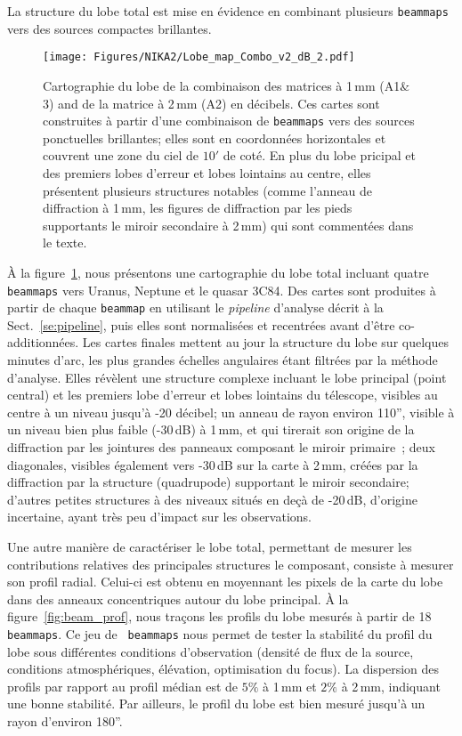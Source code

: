 La structure du lobe total est mise en évidence en combinant plusieurs
{\tt beammaps} vers des sources compactes brillantes.
\begin{figure}[!thbp]
\begin{center}
  \texttt{[image: Figures/NIKA2/Lobe\_map\_Combo\_v2\_dB\_2.pdf]}
\caption[Noticeable features of NIKA2 beam pattern.]{Cartographie du
  lobe de la combinaison des matrices à 1\,mm (A1$\&$3) and de la
  matrice à 2\,mm (A2) en décibels. Ces cartes sont construites à
  partir d'une combinaison de {\tt beammaps} vers des sources
  ponctuelles brillantes; elles sont en coordonnées horizontales et
  couvrent une zone du ciel de $10'$ de coté. En plus du lobe pricipal
  et des premiers lobes d'erreur et lobes lointains au centre, elles
  présentent plusieurs structures notables (comme l'anneau de
  diffraction à 1\,mm, les figures de diffraction par les pieds
  supportants le miroir secondaire à 2\,mm) qui sont commentées dans le
  texte.}
\label{fig:features}
\end{center}
\end{figure}
\`A la figure~\ref{fig:features}, nous présentons une cartographie du lobe
total incluant quatre {\tt beammaps} vers Uranus, Neptune et le quasar
3C84. Des cartes sont produites à partir de chaque {\tt beammap} en
utilisant le \emph{pipeline} d'analyse décrit à la
Sect.~\ref{se:pipeline}, puis elles sont normalisées et recentrées avant d'être
co-additionnées. Les cartes finales mettent au jour la structure du
lobe sur quelques minutes d'arc, les plus grandes échelles angulaires
étant filtrées par la méthode d'analyse. Elles révèlent une structure
complexe incluant le lobe principal (point central) et les premiers
lobe d'erreur et lobes lointains du télescope, visibles au centre à un
niveau jusqu'à -20 décibel; un anneau de rayon environ 110'',
visible à un niveau bien plus faible (-30\,dB) à 1\,mm, et qui
tirerait son origine de la diffraction par les jointures des panneaux
composant le miroir primaire~\citep{Greve2010}; deux diagonales,
visibles également vers -30\,dB sur la carte à 2\,mm, créées par la
diffraction par la structure (quadrupode) supportant le miroir
secondaire; d'autres petites structures à des niveaux situés en
deçà de -20\,dB, d'origine incertaine, ayant très peu d'impact sur
les observations.


Une autre manière de caractériser le lobe total, permettant de mesurer
les contributions relatives des principales structures le composant,
consiste à mesurer son profil radial. Celui-ci est obtenu en moyennant
les pixels de la carte du lobe dans des anneaux concentriques autour
du lobe principal. \`A la figure~\ref{fig:beam_prof}, nous traçons les
profils du lobe mesurés à partir de 18 {\tt beammaps}. Ce jeu de {\tt
  beammaps} nous permet de tester la stabilité du profil du lobe sous
différentes conditions d'observation (densité de flux de la source,
conditions atmosphériques, élévation, optimisation du focus). La
dispersion des profils par rapport au profil médian est de $5\%$ à
1\,mm et $2\%$ à 2\,mm, indiquant une bonne stabilité. Par ailleurs,
le profil du lobe est bien mesuré jusqu'à un rayon d'environ
180''.

